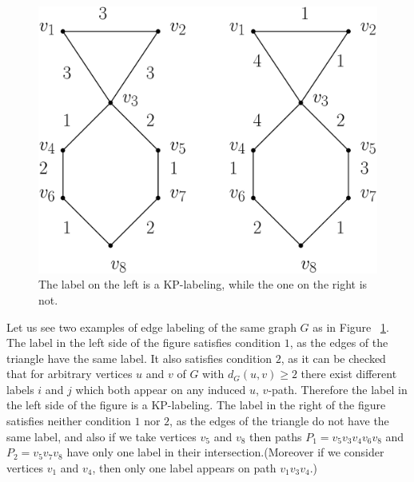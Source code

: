 \documentclass[12pt,a4paper,titlepage,openany]{report}
\begin{document}
\begin{figure}[h!]
\begin{center}
\includegraphics[width=1\linewidth]{figures/kpexample.png}
\end{center}
\caption{The label on the left is a KP-labeling, while the one on the right is not.}\label{kpexample}
\end{figure}
\begin{example}
Let us see two examples of edge labeling of the same graph $G$ as in Figure ~\ref{kpexample}.\newline
The label in the left side of the figure satisfies condition $1$, as the edges of the triangle have the same label. It also satisfies condition $2$, as it can be checked that for arbitrary vertices $u$ and $v$ of $G$ with $d_G(u,v) \geq 2$ there exist different labels $i$ and $j$ which both appear on any induced $u$, $v$-path. Therefore the label in the left side of the figure is a KP-labeling.\newline
The label in the right of the figure satisfies neither condition $1$ nor $2$, as the edges of the triangle do not have the same label, and also if we take vertices $v_5$ and $v_8$ then paths $P_1=v_5v_3v_4v_6v_8$ and $P_2=v_5v_7v_8$ have only one label in their intersection.(Moreover if we consider vertices $v_1$ and $v_4$, then only one label appears on path $v_1v_3v_4$.)
\end{example}
\end{document}
